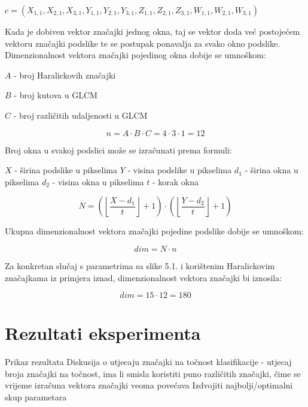 \documentclass[times, utf8, zavrsni]{fer}
\begin{document}
\bigbreak

\(
c = \left(X_{1,1}, X_{2,1}, X_{3,1}, Y_{1,1}, Y_{2,1}, Y_{3,1}, Z_{1,1}, 
Z_{2,1}, Z_{3,1}, W_{1,1}, W_{2,1}, W_{3,1}\right)
\)

\bigbreak

Kada je dobiven vektor značajki jednog okna, taj se vektor doda već postojećem 
vektoru značajki podslike te se postupak ponavalja za svako okno podslike.
\newline
Dimenzionalnost vektora značajki pojedinog okna dobije se umnoškom:

\begin{center}

\(A\) - broj Haralickovih značajki

\(B\) - broj kutova u GLCM

\(C\) - broj različitih udaljenosti u GLCM

\end{center}
\[
n = A \cdot B \cdot C = 4 \cdot 3 \cdot 1 = 12
\]

Broj okna u svakoj podslici može se izračunati prema formuli:

\begin{center}

\(X\) - širina podslike u pikselima
\(Y\) - visina podslike u pikselima
\(d_1\) - širina okna u pikselima
\(d_2\) - visina okna u pikselima
\(t\) - korak okna

\[
N = \left(\left\lfloor\frac{X-d_1}{t}\right\rfloor + 1\right) \cdot
\left(\left\lfloor\frac{Y-d_2}{t}\right\rfloor + 1\right)
\]

Ukupna dimenzionalnost vektora značajki pojedine podslike dobije se umnoškom:

\[
dim = N \cdot n
\]

Za konkretan slučaj s parametrima sa slike 5.1. i korištenim Haralickovim 
značajkama iz primjera iznad, dimenzionalnost vektora značajki bi iznosila:

\[
dim = 15 \cdot 12 = 180
\]

\end{center}


\chapter{Rezultati eksperimenta}
Prikaz rezultata 
\newline
Diskusija o utjecaju značajki na točnost klasifikacije - utjecaj
broja značajki na točnost, ima li smisla koristiti puno različitih značajki,
čime se vrijeme izračuna vektora značajki veoma povećava
\newline
Izdvojiti najbolji/optimalni skup parametara
\end{document}

